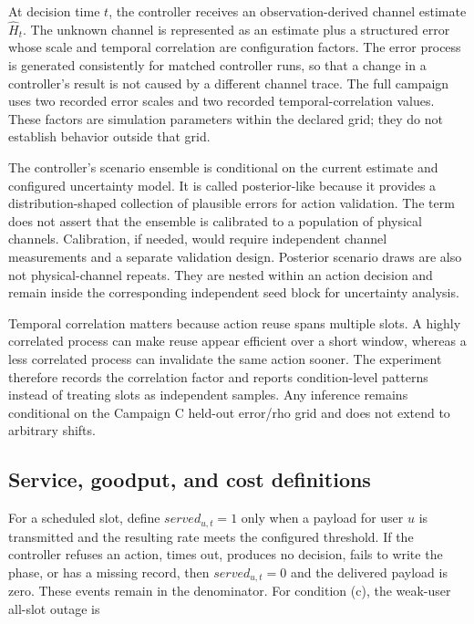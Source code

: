 \documentclass[10pt,twocolumn]{article}
\begin{document}
At decision time \(t\), the controller receives an observation-derived
channel estimate \(\widehat H_t\). The unknown channel is represented as
an estimate plus a structured error whose scale and temporal correlation
are configuration factors. The error process is generated consistently
for matched controller runs, so that a change in a controller's result
is not caused by a different channel trace. The full campaign uses two
recorded error scales and two recorded temporal-correlation values.
These factors are simulation parameters within the declared grid; they
do not establish behavior outside that grid.

The controller's scenario ensemble is conditional on the current
estimate and configured uncertainty model. It is called posterior-like
because it provides a distribution-shaped collection of plausible errors
for action validation. The term does not assert that the ensemble is
calibrated to a population of physical channels. Calibration, if needed,
would require independent channel measurements and a separate validation
design. Posterior scenario draws are also not physical-channel repeats.
They are nested within an action decision and remain inside the
corresponding independent seed block for uncertainty analysis.

Temporal correlation matters because action reuse spans multiple slots.
A highly correlated process can make reuse appear efficient over a short
window, whereas a less correlated process can invalidate the same action
sooner. The experiment therefore records the correlation factor and
reports condition-level patterns instead of treating slots as
independent samples. Any inference remains conditional on the Campaign C
held-out error/rho grid and does not extend to arbitrary shifts.

\subsection{Service, goodput, and cost
definitions}\label{service-goodput-and-cost-definitions}

For a scheduled slot, define \(served_{u,t}=1\) only when a payload for
user \(u\) is transmitted and the resulting rate meets the configured
threshold. If the controller refuses an action, times out, produces no
decision, fails to write the phase, or has a missing record, then
\(served_{u,t}=0\) and the delivered payload is zero. These events
remain in the denominator. For condition (c), the weak-user all-slot
outage is
\end{document}
